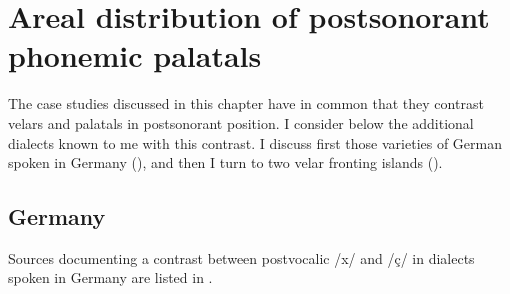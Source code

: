 \section{Areal distribution of postsonorant phonemic palatals}\label{sec:9.5}

The case studies discussed in this chapter have in common that they contrast velars and palatals in postsonorant position. I consider below the additional dialects known to me with this contrast. I discuss first those varieties of German spoken in Germany (), and then I turn to two velar fronting islands ().

\subsection{Germany}\label{sec:9.5.1}

Sources documenting a contrast between postvocalic /x/ and /ç/ in dialects spoken in Germany are listed in .

